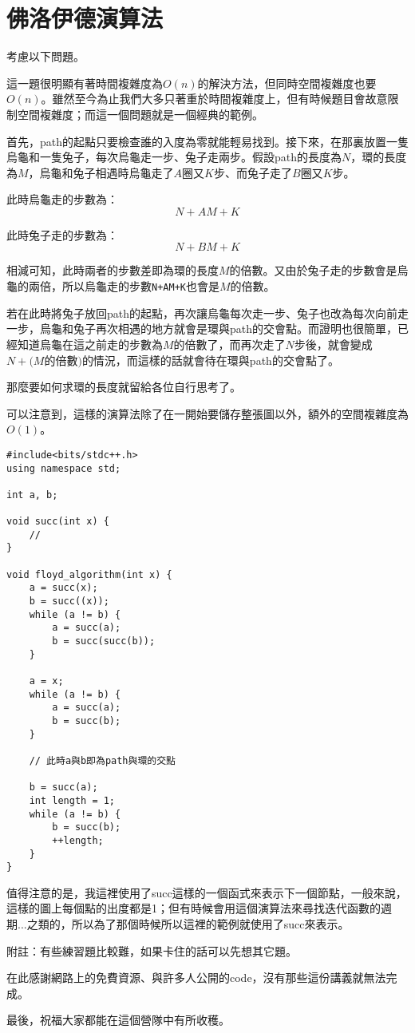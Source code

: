 \section{佛洛伊德演算法}

考慮以下問題。


這一題很明顯有著時間複雜度為$O(n)$的解決方法，但同時空間複雜度也要$O(n)$。雖然至今為止我們大多只著重於時間複雜度上，但有時候題目會故意限制空間複雜度；而這一個問題就是一個經典的範例。

首先，path的起點只要檢查誰的入度為零就能輕易找到。接下來，在那裏放置一隻烏龜和一隻兔子，每次烏龜走一步、兔子走兩步。假設path的長度為$N$，環的長度為$M$，烏龜和兔子相遇時烏龜走了$A$圈又$K$步、而兔子走了$B$圈又$K$步。

此時烏龜走的步數為：$$N+AM+K$$

此時兔子走的步數為：$$N+BM+K$$

相減可知，此時兩者的步數差即為環的長度$M$的倍數。又由於兔子走的步數會是烏龜的兩倍，所以烏龜走的步數\lstinline{N+AM+K}也會是$M$的倍數。

若在此時將兔子放回path的起點，再次讓烏龜每次走一步、兔子也改為每次向前走一步，烏龜和兔子再次相遇的地方就會是環與path的交會點。而證明也很簡單，已經知道烏龜在這之前走的步數為$M$的倍數了，而再次走了$N$步後，就會變成$N+(M$的倍數$)$的情況，而這樣的話就會待在環與path的交會點了。

那麼要如何求環的長度就留給各位自行思考了。

可以注意到，這樣的演算法除了在一開始要儲存整張圖以外，額外的空間複雜度為$O(1)$。

\begin{lstlisting}[caption=floyd algorithm範例]
#include<bits/stdc++.h>
using namespace std;

int a, b;

void succ(int x) {
	// 
}

void floyd_algorithm(int x) {
	a = succ(x);
	b = succ((x));
	while (a != b) {
		a = succ(a);
		b = succ(succ(b));
	}
	
	a = x;
	while (a != b) {
		a = succ(a);
		b = succ(b);
	}
	
	// 此時a與b即為path與環的交點
	
	b = succ(a);
	int length = 1;
	while (a != b) {
		b = succ(b);
		++length;
	}
} 
\end{lstlisting}

值得注意的是，我這裡使用了succ這樣的一個函式來表示下一個節點，一般來說，這樣的圖上每個點的出度都是1；但有時候會用這個演算法來尋找迭代函數的週期...之類的，所以為了那個時候所以這裡的範例就使用了succ來表示。

\hspace*{\fill}

附註：有些練習題比較難，如果卡住的話可以先想其它題。

在此感謝網路上的免費資源、與許多人公開的code，沒有那些這份講義就無法完成。

最後，祝福大家都能在這個營隊中有所收穫。